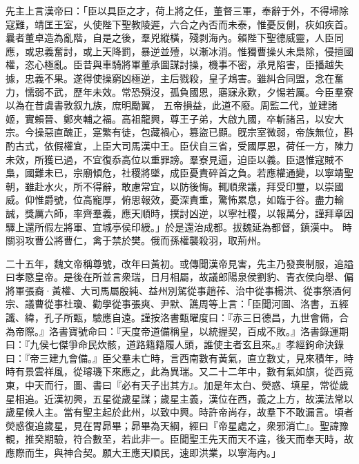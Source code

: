 \begin{pinyinscope}
 
先主上言漢帝曰：「臣以具臣之才，荷上將之任，董督三軍，奉辭于外，不得埽除寇難，靖匡王室，乆使陛下聖教陵遲，六合之內否而未泰，惟憂反側，疢如疾首。曩者董卓造為亂階，自是之後，羣兇縱橫，殘剥海內。賴陛下聖德威靈，人臣同應，或忠義奮討，或上天降罰，暴逆並殪，以漸冰消。惟獨曹操乆未梟除，侵擅國權，恣心極亂。臣昔與車騎將軍董承圖謀討操，機事不密，承見陷害，臣播越失據，忠義不果。遂得使操窮凶極逆，主后戮殺，皇子鴆害。雖糾合同盟，念在奮力，懦弱不武，歷年未效。常恐殞沒，孤負國恩，寤寐永歎，夕惕若厲。今臣羣寮以為在昔虞書敦叙九族，庶明勵翼，
 五帝損益，此道不廢。周監二代，並建諸姬，實賴晉、鄭夾輔之福。高祖龍興，尊王子弟，大啟九國，卒斬諸呂，以安大宗。今操惡直醜正，寔繁有徒，包藏禍心，篡盜已顯。旣宗室微弱，帝族無位，斟酌古式，依假權宜，上臣大司馬漢中王。臣伏自三省，受國厚恩，荷任一方，陳力未效，所獲已過，不宜復忝高位以重罪謗。羣寮見逼，迫臣以義。臣退惟寇賊不梟，國難未已，宗廟傾危，社稷將墜，成臣憂責碎首之負。若應權通變，以寧靖聖朝，雖赴水火，所不得辭，敢慮常宜，以防後悔。輒順衆議，拜受印璽，以崇國威。仰惟爵號，位高寵厚，俯思報效，憂深責重，驚怖累息，如臨于谷。盡力輸誠，獎厲六師，率齊羣義，應天順時，撲討凶逆，以寧社稷，以報萬分，謹拜章因驛上還所假左將軍、宜城亭侯印綬。」於是還治成都。拔魏延為都督，鎮漢中。
 時關羽攻曹公將曹仁，禽于禁於樊。俄而孫權襲殺羽，取荊州。
 
 
 
 
 二十五年，魏文帝稱尊號，改年曰黃初。或傳聞漢帝見害，先主乃發喪制服，追謚曰孝愍皇帝。是後在所並言衆瑞，日月相屬，故議郎陽泉侯劉豹、青衣侯向舉、偏將軍張裔·黃權、大司馬屬殷純、益州別駕從事趙莋、治中從事楊洪、從事祭酒何宗、議曹從事杜瓊、勸學從事張爽、尹默、譙周等上言：「臣聞河圖、洛書，五經讖、緯，孔子所甄，驗應自遠。謹按洛書甄曜度曰：『赤三日德昌，九世會備，合為帝際。』洛書寶號命曰：『天度帝道備稱皇，以統握契，百成不敗。』洛書錄運期曰：『九侯七傑爭命民炊骸，道路籍籍履人頭，誰使主者玄且來。』孝經鉤命決錄曰：『帝三建九會備。』臣父羣未亡時，言西南數有黃氣，直立數丈，見來積年，時時有景雲祥風，從璿璣下來應之，此為異瑞。又二十二年中，數有氣如旗，從西竟東，中天而行，圖、書曰『必有天子出其方』。加是年太白、熒惑、填星，常從歲星相追。近漢初興，五星從歲星謀；歲星主義，漢位在西，義之上方，故漢法常以歲星候人主。當有聖主起於此州，以致中興。時許帝尚存，故羣下不敢漏言。頃者熒惑復追歲星，見在胃昴畢；昴畢為天綱，經曰『帝星處之，衆邪消亡』。聖諱豫覩，推癸期驗，符合數至，若此非一。臣聞聖王先天而天不違，後天而奉天時，故應際而生，與神合契。願大王應天順民，速即洪業，以寧海內。」
 

\end{pinyinscope}
